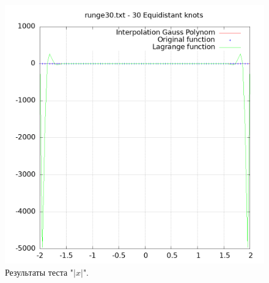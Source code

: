 \documentclass[14pt,a4paper]{extarticle}
\newcommand{\1}{\mathbbm{1}}
\begin{document}
    \begin{figure}
        \centering
        \includegraphics[scale=0.5]{Images/runge30.txt.png}
        \caption{Результаты теста "$|x|$".}
    \end{figure}
\end{document}
